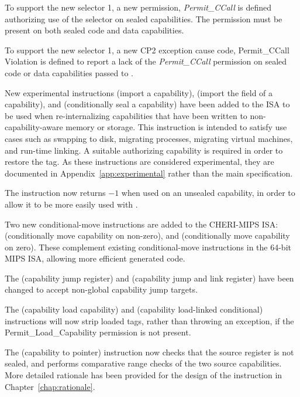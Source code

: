 \begin{description}
  To support the new  selector 1, a new permission,
  \emph{Permit\_CCall} is defined authorizing use of the selector on sealed
  capabilities.
  The permission must be present on both sealed code and data capabilities.

  To support the new  selector 1, a new CP2 exception cause
  code, Permit\_CCall Violation is defined to report a lack of the
  \emph{Permit\_CCall} permission on sealed code or data capabilities passed to
  .

  New experimental instructions  (import a capability),
   (import the \cotype{} field of a capability), and
   (conditionally seal a capability) have been added
  to the ISA to be used when re-internalizing capabilities that have been
  written to non-capability-aware memory or storage.
  This instruction is intended to satisfy use cases such as swapping to
  disk, migrating processes, migrating virtual machines, and run-time linking.
  A suitable authorizing capability is required in order to restore the
  tag.
  As these instructions are considered experimental, they are documented in
  Appendix~\ref{app:experimental} rather than the main specification.

  The  instruction now returns $-1$ when used on an
  unsealed capability, in order to allow it to be more easily used with
  .

  Two new conditional-move instructions are added to the CHERI-MIPS ISA:
   (conditionally move capability on non-zero), and
   (conditionally move capability on zero).
  These complement existing conditional-move instructions in the 64-bit MIPS
  ISA, allowing more efficient generated code.

  The  (capability jump register) and 
  (capability jump and link register) have been changed to accept non-global
  capability jump targets.

  The  (capability load capability) and 
  (capability load-linked conditional) instructions will now strip loaded tags,
  rather than throwing an exception, if the Permit\_Load\_Capability permission
  is not present.

  The  (capability to pointer) instruction now checks that
  the source register is not sealed, and performs comparative range checks of
  the two source capabilities.
  More detailed rationale has been provided for the design of the
   instruction in Chapter~\ref{chap:rationale}.


\end{description}
